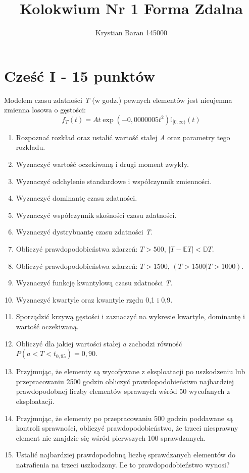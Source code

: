 \documentclass{article}
\author{Krystian Baran 145000}
\title{Kolokwium Nr 1 Forma Zdalna}
\begin{document}
\maketitle
\newpage

\tableofcontents
\newpage

\section{Cześć I - 15 punktów}
Modelem czasu zdatności \textit{T} (w godz.) pewnych elementów jest nieujemna zmienna losowa
o gęstości:
\[ f_T(t) = At \exp(-0,0000005 t^2)\mathbb{I}_{[0,\infty)}(t) \]
\begin{enumerate}[label = \alph*)]
\item Rozpoznać rozkład oraz ustalić wartość stałej \textit{A} oraz parametry tego rozkładu.
\item Wyznaczyć wartość oczekiwaną i drugi moment zwykły.
\item Wyznaczyć odchylenie standardowe i współczynnik zmienności.
\item Wyznaczyć dominantę czasu zdatności.
\item Wyznaczyć współczynnik skośności czasu zdatności.
\item Wyznaczyć dystrybuantę czasu zdatności \textit{T}.
\item Obliczyć prawdopodobieństwa zdarzeń: $T > 500$, $|T - \mathbb{E}T| < \mathbb{D}T$.
\item Obliczyć prawdopodobieństwa zdarzeń: $T > 1500$, $(T > 1500|T > 1000)$.
\item Wyznaczyć funkcję kwantylową czasu zdatności \textit{T}.
\item Wyznaczyć kwartyle oraz kwantyle rzędu 0,1 i 0,9.
\item Sporządzić krzywą gęstości i zaznaczyć na wykresie kwartyle, dominantę i wartość
oczekiwaną.
\item Obliczyć dla jakiej wartości stałej \textit{a} zachodzi równość $P(a < T < t_{0,95}) = 0,90$.
\item Przyjmując, że elementy są wycofywane z eksploatacji po uszkodzeniu lub
przepracowaniu 2500 godzin obliczyć prawdopodobieństwo najbardziej
prawdopodobnej liczby elementów sprawnych wśród 50 wycofanych z eksploatacji.
\item Przyjmując, że elementy po przepracowaniu 500 godzin poddawane są kontroli
sprawności, obliczyć prawdopodobieństwo, że trzeci niesprawny element nie znajdzie
się wśród pierwszych 100 sprawdzanych.
\item Ustalić najbardziej prawdopodobną liczbę sprawdzanych elementów do natrafienia na
trzeci uszkodzony. Ile to prawdopodobieństwo wynosi? 
\end{enumerate}
\end{document}
